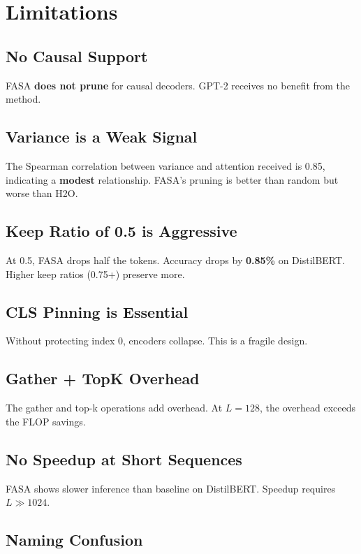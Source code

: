 \section{Limitations}

\subsection{No Causal Support}

FASA \textbf{does not prune} for causal decoders. GPT-2 receives no benefit 
from the method.

\subsection{Variance is a Weak Signal}

The Spearman correlation between variance and attention received is 
0.85, indicating a \textbf{modest} relationship. FASA's pruning is 
better than random but worse than H2O.

\subsection{Keep Ratio of 0.5 is Aggressive}

At 0.5, FASA drops half the tokens. Accuracy drops by \textbf{0.85\%} on 
DistilBERT. Higher keep ratios (0.75+) preserve more.

\subsection{CLS Pinning is Essential}

Without protecting index 0, encoders collapse. This is a fragile design.

\subsection{Gather + TopK Overhead}

The gather and top-k operations add overhead. At $L = 128$, the overhead 
exceeds the FLOP savings.

\subsection{No Speedup at Short Sequences}

FASA shows slower inference than baseline on DistilBERT. Speedup requires 
$L \gg 1024$.

\subsection{Naming Confusion}

